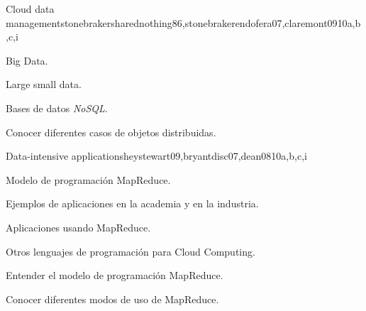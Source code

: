 \begin{syllabus}
\begin{unit}{Cloud data management}{stonebrakersharednothing86,stonebrakerendofera07,claremont09}{10}{a,b,c,i}
   \begin{topics}
      \item \IMInformationModelsTopicInformationStorage%
      \item \IMInformationModelsTopicSearch%
      \item \IMInformationModelsTopicScalability%
      \item \IMDatabaseSystemsTopicDatabase%
      \item \IMDistributedDatabasesAllTopics%
      \item Big Data.
      \item Large small data.
      \item Bases de datos \textit{NoSQL}.
   \end{topics}

    \begin{unitgoals}
      \item \IMInformationModelsObjTWO%
      \item \IMInformationModelsObjSEVEN%
      \item \IMInformationModelsObjEIGHT%
      \item \IMInformationModelsObjNINE%
      \item \IMDistributedDatabasesObjTWO%
      \item Conocer diferentes casos de objetos distribuidas.
   \end{unitgoals}
\end{unit}


\begin{unit}{Data-intensive applications}{heystewart09,bryantdisc07,dean08}{10}{a,b,c,i}
    \begin{topics}
      \item Modelo de programación MapReduce.
      \item Ejemplos de aplicaciones en la academia y en la industria.
      \item Aplicaciones usando MapReduce.
      \item Otros lenguajes de programación para Cloud Computing.
   \end{topics}

   \begin{unitgoals}
      \item Entender el modelo de programación MapReduce.
      \item Conocer diferentes modos de uso de MapReduce. 
      \item \IMInformationModelsObjEIGHT%
      \item \IMInformationModelsObjNINE%
      \item \IMDistributedDatabasesObjTWO%
   \end{unitgoals}
\end{unit}



\end{syllabus}

